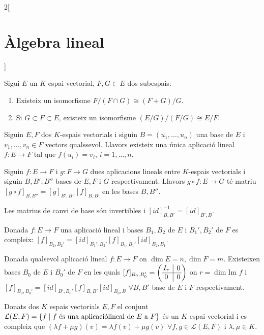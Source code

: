 \documentclass[class=article,10pt,crop=false]{standalone}
\begin{document}
\begin{multicols}{2}[\section{Àlgebra lineal}]
\begin{corollary}
\end{corollary}
\begin{theorem}
Sigui $E$ un $K$-espai vectorial, $F,G\subset E$ dos subespais:
\begin{enumerate}
    \item Existeix un isomorfisme $F/(F\cap G)\cong(F+G)/G$.
    \item Si $G\subset F\subset E$, existeix un isomorfisme $(E/G)/(F/G)\cong E/F$.
\end{enumerate}
\end{theorem}
\begin{theorem}
Siguin $E,F$ dos $K$-espais vectorials i siguin $B=(u_1,\ldots,u_n)$ una base de $E$ i $v_1,\ldots,v_n\in F$ vectors qualssevol. Llavors existeix una única aplicació lineal $f:E\rightarrow F$ tal que $f(u_i)=v_i$, $i=1,\ldots,n$. 
\end{theorem}
\begin{prop}
Siguin $f:E\rightarrow F$ i $g:F\rightarrow G$ dues aplicacions lineals entre $K$-espais vectorials i siguin $B,B',B''$ bases de $E,F$ i $G$ respectivament. Llavors $g\circ f:E\rightarrow G$ té matriu $[g\circ f]_{B,B''}=[g]_{B',B''}[f]_{B,B'}$ en les bases $B, B''$.
\end{prop}
\begin{corollary}
Les matrius de canvi de base són invertibles i $[id]_{B,B'}^{-1}=[id]_{B',B}$.
\end{corollary}
\begin{prop}
Donada $f:E\rightarrow F$ una aplicació lineal i bases $B_1,B_2$ de $E$ i $B_1',B_2'$ de $F$ es compleix: $[f]_{B_2,B_2'}=[id]_{B_1',B_2'}[f]_{B_1,B_1'}[id]_{B_2,B_1}$.
\end{prop}
\begin{theorem}
Donada qualsevol aplicació lineal $f:E\rightarrow F$ on $\dim E=n, \dim F=m$. Existeixen bases $B_0$ de $E$ i $B_0'$ de $F$ en les quals $[f]_{B_0,B_0'}=\left(\begin{array}{@{\,} c|c @{\,}}
    I_r & 0\\
    \hline
    0 & 0
    \end{array}\right)$ on $r=\dim\text{Im }f$ i $[f]_{B_0,B_0'}=[id]_{B',B_0'}[f]_{B,B'}[id]_{B_0,B}$ $\forall B,B'$ base de $E$ i $F$ respectivament.
\end{theorem}
\begin{lemma}
Donats dos $K$ espais vectorials $E,F$ el conjunt $\mathcal{L}(E,F)=\{f\mid f\text{ és una aplicació}\\ \text{lineal de $E$ a $F$}\}$ és un $K$-espai vectorial i es compleix que $(\lambda f+\mu g)(v)=\lambda f(v)+\mu g(v)$ $\forall f,g\in\mathcal{L}(E,F)$ i $\lambda,\mu\in K$.

\end{lemma}
\end{multicols}
\end{document}
